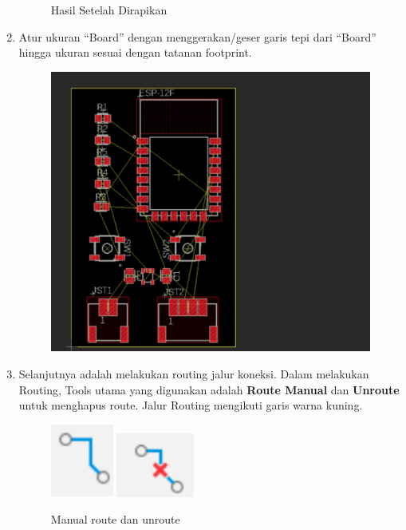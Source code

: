 \begin{enumerate}
\begin{figure}[H]
        \caption{Hasil Setelah Dirapikan}
        \label{fig:hasilsetelahdirapikan}
    \end{figure} 
    \item Atur ukuran “Board” dengan menggerakan/geser garis tepi dari “Board” hingga ukuran
    sesuai dengan tatanan footprint.
        \begin{figure}[H]
            \centering
            \includegraphics[width=0.7\linewidth]{P1/img/aturukuranboard.png}
        \end{figure}
    \item Selanjutnya adalah melakukan routing jalur koneksi. Dalam melakukan Routing, Tools
    utama yang digunakan adalah \textbf{Route Manual} dan \textbf{Unroute} untuk
    menghapus route. Jalur Routing mengikuti garis warna kuning.
        \begin{figure}[H]
            \centering
            \includegraphics[width=0.12\linewidth]{P1/img/manualroute.png}
            \includegraphics[width=0.17\linewidth]{P1/img/unroute.png}
            \caption{Manual route dan unroute}
        \end{figure}
        \begin{figure}[H]
            \centering

\end{figure}
\end{enumerate}
